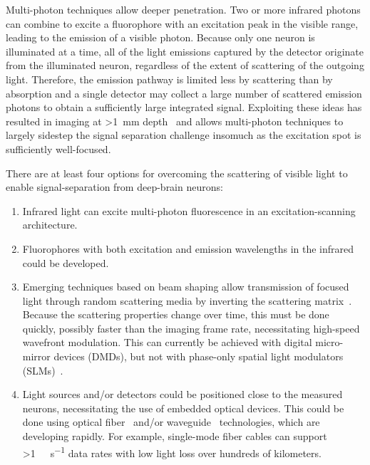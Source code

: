 Multi-photon techniques allow deeper penetration.
Two or more infrared photons can combine to excite a fluorophore with an excitation peak in the visible range, leading to the emission of a visible photon.
Because only one neuron is illuminated at a time, all of the light emissions captured by the detector originate from the illuminated neuron, regardless of the extent of scattering of the outgoing light.
Therefore, the emission pathway is limited less by scattering than by absorption and a single detector may collect a large number of scattered emission photons to obtain a sufficiently large integrated signal.
Exploiting these ideas has resulted in imaging at \SI{>1}{\milli\meter} depth~\cite{horton13,kobat09} and allows multi-photon techniques to largely sidestep the signal separation challenge insomuch as the excitation spot is sufficiently well-focused.

There are at least four options for overcoming the scattering of visible light to enable signal-separation from deep-brain neurons:

\begin{enumerate}
\item Infrared light can excite multi-photon fluorescence in an excitation-scanning architecture.
\item Fluorophores with both excitation and emission wavelengths in the infrared could be developed.
\item Emerging techniques based on beam shaping allow transmission of focused light through random scattering media by inverting the scattering matrix~\cite{conkey12}.
Because the scattering properties change over time, this must be done quickly, possibly faster than the imaging frame rate, necessitating high-speed wavefront modulation.
This can currently be achieved with digital micro-mirror devices (DMDs), but not with phase-only spatial light modulators (SLMs)~\cite{alivisatos13}.
\item Light sources and/or detectors could be positioned close to the measured neurons, necessitating the use of embedded optical devices.
This could be done using optical fiber~\cite{mahalati13} and/or waveguide~\cite{zorzos10,zorzos12} technologies, which are developing rapidly.
For example, single-mode fiber cables can support \SI{>1}{\tera\byte\per\second} data rates with low light loss over hundreds of kilometers.
\end{enumerate}

